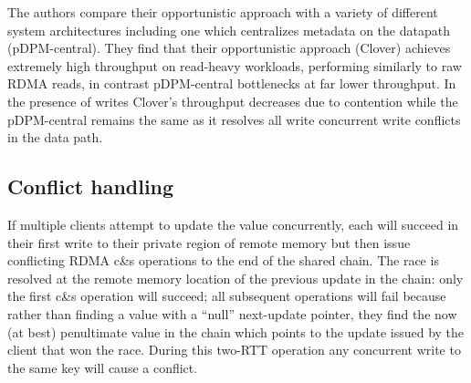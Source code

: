 
The authors compare their opportunistic approach with a variety of different
system architectures including one which centralizes metadata on the datapath
(pDPM-central). They find that their opportunistic approach (Clover) achieves
extremely high throughput on read-heavy workloads, performing similarly to
raw RDMA reads, in contrast pDPM-central bottlenecks at far lower throughput.
In the presence of writes Clover's throughput decreases due to contention
while the pDPM-central remains the same as it resolves all write concurrent
write conflicts in the data path.



\subsection{Conflict handling}

If multiple clients attempt to update the value concurrently, each will
succeed in their first write to their private region of remote memory but
then issue conflicting RDMA c\&s operations to the end of the shared chain.
The race is resolved at the remote memory location of the previous update in
the chain: only the first c\&s operation will succeed; all subsequent
operations will fail because rather than finding a value with a ``null''
next-update pointer, they find the now (at best) penultimate value in the
chain which points to the update issued by the client that won the race.
During this two-RTT operation any concurrent write to the same key will cause
a conflict.



